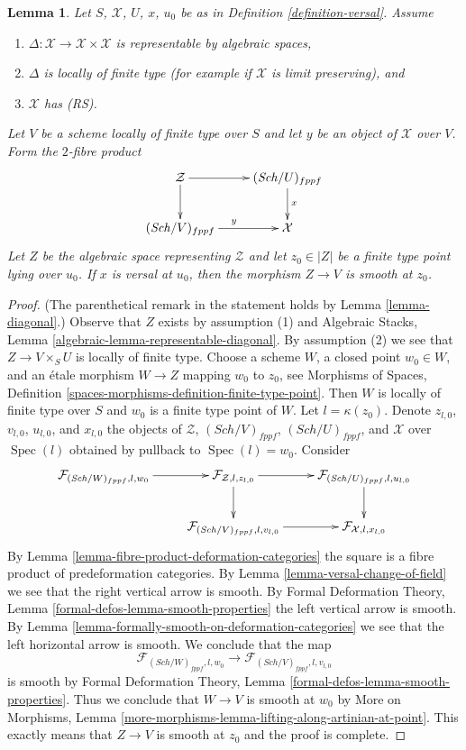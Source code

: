 \documentclass{stacks-project}
\theoremstyle{plain}
\newtheorem{lemma}[subsection]{Lemma}
\theoremstyle{definition}
\theoremstyle{remark}
\numberwithin{equation}{subsection}
\def\Spec{\mathop{\mathrm{Spec}}}
\def\Sch{\mathit{Sch}}
\begin{document}
\begin{lemma}
\label{lemma-base-change-versal}
Let $S$, $\mathcal{X}$, $U$, $x$, $u_0$ be as in
Definition \ref{definition-versal}. Assume
\begin{enumerate}
\item $\Delta : \mathcal{X} \to \mathcal{X} \times \mathcal{X}$
is representable by algebraic spaces,
\item $\Delta$ is locally of finite type
(for example if $\mathcal{X}$ is limit preserving), and
\item $\mathcal{X}$ has (RS).
\end{enumerate}
Let $V$ be a scheme locally of finite type over $S$
and let $y$ be an object of $\mathcal{X}$ over $V$.
Form the $2$-fibre product
$$
\xymatrix{
\mathcal{Z} \ar[r] \ar[d] & (\Sch/U)_{fppf} \ar[d]^x \\
(\Sch/V)_{fppf} \ar[r]^y & \mathcal{X}
}
$$
Let $Z$ be the algebraic space representing $\mathcal{Z}$
and let $z_0 \in |Z|$ be a finite type point lying over $u_0$.
If $x$ is versal at $u_0$, then
the morphism $Z \to V$ is smooth at $z_0$.
\end{lemma}

\begin{proof}
(The parenthetical remark in the statement holds by
Lemma \ref{lemma-diagonal}.)
Observe that $Z$ exists by assumption (1) and Algebraic Stacks, Lemma
\ref{algebraic-lemma-representable-diagonal}. By assumption (2) we see that
$Z \to V \times_S U$ is locally of finite type.
Choose a scheme $W$, a closed point $w_0 \in W$, and
an \'etale morphism $W \to Z$ mapping $w_0$ to $z_0$, see
Morphisms of Spaces, Definition
\ref{spaces-morphisms-definition-finite-type-point}.
Then $W$ is locally of finite type over $S$ and
$w_0$ is a finite type point of $W$.
Let $l = \kappa(z_0)$. Denote $z_{l, 0}$, $v_{l, 0}$,
$u_{l, 0}$, and $x_{l, 0}$ the objects of
$\mathcal{Z}$, $(\Sch/V)_{fppf}$, $(\Sch/U)_{fppf}$,
and $\mathcal{X}$ over $\Spec(l)$ obtained by pullback to $\Spec(l) = w_0$.
Consider
$$
\xymatrix{
\mathcal{F}_{(\Sch/W)_{fppf}, l, w_0} \ar[r] &
\mathcal{F}_{\mathcal{Z}, l, z_{l, 0}} \ar[d] \ar[r] &
\mathcal{F}_{(\Sch/U)_{fppf}, l, u_{l, 0}} \ar[d] \\
& \mathcal{F}_{(\Sch/V)_{fppf}, l, v_{l, 0}} \ar[r] &
\mathcal{F}_{\mathcal{X}, l, x_{l, 0}}
}
$$
By Lemma \ref{lemma-fibre-product-deformation-categories}
the square is a fibre product of predeformation categories.
By Lemma \ref{lemma-versal-change-of-field}
we see that the right vertical arrow is smooth.
By Formal Deformation Theory, Lemma
\ref{formal-defos-lemma-smooth-properties}
the left vertical arrow is smooth.
By Lemma \ref{lemma-formally-smooth-on-deformation-categories}
we see that the left horizontal arrow is smooth.
We conclude that the map
$$
\mathcal{F}_{(\Sch/W)_{fppf}, l, w_0} \to
\mathcal{F}_{(\Sch/V)_{fppf}, l, v_{l, 0}}
$$
is smooth by Formal Deformation Theory, Lemma
\ref{formal-defos-lemma-smooth-properties}.
Thus we conclude that $W \to V$ is smooth at $w_0$ by
More on Morphisms, Lemma
\ref{more-morphisms-lemma-lifting-along-artinian-at-point}.
This exactly means that $Z \to V$ is smooth at $z_0$
and the proof is complete.
\end{proof}
\end{document}

